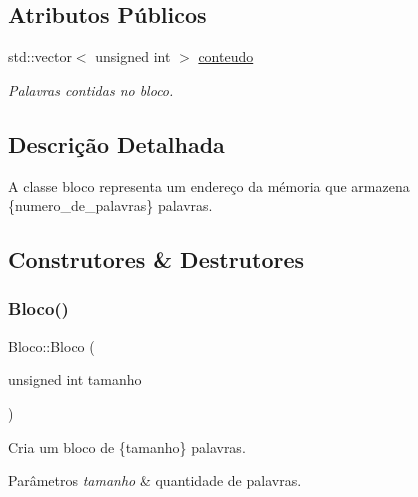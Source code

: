 \subsection*{Atributos Públicos}
\begin{DoxyCompactItemize}
\item 
\mbox{\label{structBloco_ac6dbb14d476c08f86f91bcb6fbce4e20}} 
std\+::vector$<$ unsigned int $>$ \hyperlink{structBloco_ac6dbb14d476c08f86f91bcb6fbce4e20}{conteudo}
\begin{DoxyCompactList}\small\item\em Palavras contidas no bloco. \end{DoxyCompactList}\end{DoxyCompactItemize}


\subsection{Descrição Detalhada}
A classe bloco representa um endereço da mémoria que armazena \{numero\+\_\+de\+\_\+palavras\} palavras. 

\subsection{Construtores \& Destrutores}
\mbox{\label{structBloco_a7690a145e0f647595d28c633d034abb3}} 
\subsubsection{\texorpdfstring{Bloco()}{Bloco()}\hspace{0.1cm}{\footnotesize\ttfamily [1/2]}}
{\footnotesize\ttfamily Bloco\+::\+Bloco (\begin{DoxyParamCaption}\item[{unsigned int}]{tamanho }\end{DoxyParamCaption})\hspace{0.3cm}{\ttfamily [inline]}}



Cria um bloco de \{tamanho\} palavras. 


\begin{DoxyParams}{Parâmetros}
{\em tamanho} & quantidade de palavras. \\
\hline
\end{DoxyParams}
\mbox{\label{structBloco_a23af86d8bfc57541015b41571d4558f8}} 
